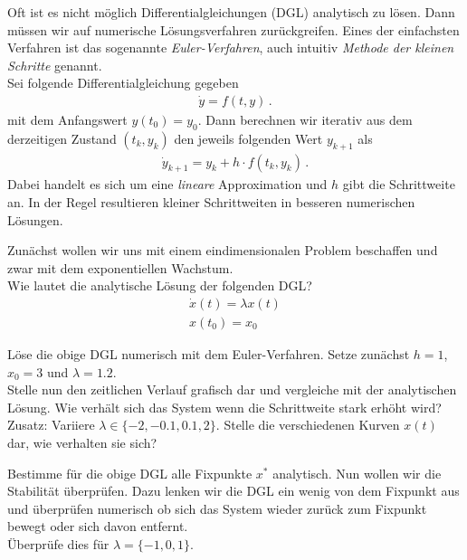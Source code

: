 
 \exercise[%
 topic = Numerisches Lösen von Differentialgleichungen
  ]


Oft ist es nicht möglich Differentialgleichungen (DGL) analytisch zu lösen. Dann müssen wir auf numerische Lösungsverfahren zurückgreifen. Eines der einfachsten Verfahren ist das sogenannte \emph{Euler-Verfahren}, auch intuitiv \emph{Methode der kleinen Schritte} genannt.\\
Sei folgende Differentialgleichung gegeben 
\begin{align}
\dot y = f(t,y)\,.
\end{align}
mit dem Anfangswert $y(t_0)=y_0$. Dann berechnen wir iterativ aus dem derzeitigen Zustand $(t_k,y_k)$ den jeweils folgenden Wert $y_{k+1}$ als
\begin{align}
\dot y_{k+1} =y_k + h\cdot f(t_k,y_k)\,.
\end{align}
Dabei handelt es sich um eine \emph{lineare} Approximation und $h$ gibt die Schrittweite an. In der Regel resultieren kleiner Schrittweiten in besseren numerischen Lösungen.\\

 \subexercise[%
  topic={Exponentielles Wachstum},
    ]
		
Zunächst wollen wir uns mit einem eindimensionalen Problem beschaffen und zwar mit dem exponentiellen Wachstum.\\
Wie lautet die analytische Lösung der folgenden DGL?
\begin{align}
\dot x(t) = \lambda x(t)\\
x(t_0)=x_0
\label{eqn:exponentielles}
\end{align}

\subexercise[%
  topic={Eindimensionales Euler-Verfahren},
    ]
Löse die obige DGL numerisch mit dem Euler-Verfahren. Setze zunächst $h=1$, $x_0=3$ und $\lambda=1.2$.\\
Stelle nun den zeitlichen Verlauf grafisch dar und vergleiche mit der analytischen Lösung. Wie verhält sich das System wenn die Schrittweite stark erhöht wird?\\
Zusatz: Variiere $\lambda \in \{-2,-0.1,0.1,2\}$. Stelle die verschiedenen Kurven $x(t)$ dar, wie verhalten sie sich? 

\subexercise[%
  topic={Numerisches Überprüfen der Stabilität von Fixpunkten},
    ]
Bestimme für die obige DGL alle Fixpunkte $x^{*}$ analytisch. Nun wollen wir die Stabilität überprüfen. Dazu lenken wir die DGL ein wenig von dem Fixpunkt aus und überprüfen numerisch ob sich das System wieder zurück zum Fixpunkt bewegt oder sich davon entfernt.\\
Überprüfe dies für $\lambda = \{-1,0,1\}$.

